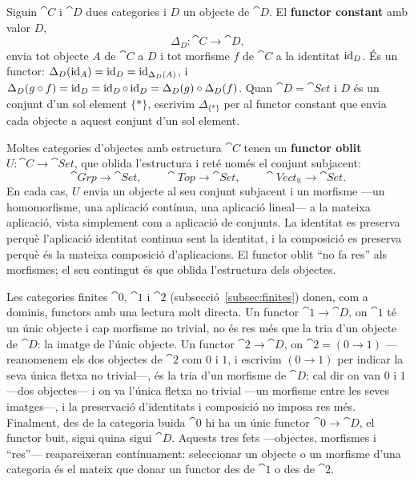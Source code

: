 \begin{exemple}\label{ex:functor-constant}
Siguin $\cat{C}$ i $\cat{D}$ dues categories i $D$ un objecte de $\cat{D}$. El \textbf{functor constant} amb valor $D$,
\[
\Delta_D\colon\cat{C}\to\cat{D},
\]
envia tot objecte $A$ de $\cat{C}$ a $D$ i tot morfisme $f$ de $\cat{C}$ a la identitat $\operatorname{id}_D$. És un functor: $\Delta_D(\operatorname{id}_A)=\operatorname{id}_D=\operatorname{id}_{\Delta_D(A)}$, i $\Delta_D(g\circ f)=\operatorname{id}_D=\operatorname{id}_D\circ\operatorname{id}_D=\Delta_D(g)\circ\Delta_D(f)$. Quan $\cat{D}=\cat{Set}$ i $D$ és un conjunt d'un sol element $\{\ast\}$, escrivim $\Delta_{\{\ast\}}$ per al functor constant que envia cada objecte a aquest conjunt d'un sol element.
\end{exemple}

\begin{exemple}
Moltes categories d'objectes amb estructura $\cat{C}$ tenen un \textbf{functor oblit} $U\colon\cat{C}\to\cat{Set}$, que oblida l'estructura i reté només el conjunt subjacent:
\[
\cat{Grp}\to\cat{Set},
\qquad
\cat{Top}\to\cat{Set},
\qquad
\cat{Vect}_{\mathbb K}\to\cat{Set}.
\]
En cada cas, $U$ envia un objecte al seu conjunt subjacent i un morfisme ---un homomorfisme, una aplicació contínua, una aplicació lineal--- a la mateixa aplicació, vista simplement com a aplicació de conjunts. La identitat es preserva perquè l'aplicació identitat continua sent la identitat, i la composició es preserva perquè és la mateixa composició d'aplicacions. El functor oblit \enquote{no fa res} als morfismes; el seu contingut és que oblida l'estructura dels objectes.
\end{exemple}

\begin{exemple}
Les categories finites $\cat{0}$, $\cat{1}$ i $\cat{2}$ (subsecció~\ref{subsec:finites}) donen, com a dominis, functors amb una lectura molt directa. Un functor $\cat{1}\to\cat{D}$, on $\cat{1}$ té un únic objecte i cap morfisme no trivial, no és res més que la tria d'un objecte de $\cat{D}$: la imatge de l'únic objecte. Un functor $\cat{2}\to\cat{D}$, on $\cat{2}=(0\to 1)$ ---reanomenem els dos objectes de $\cat{2}$ com $0$ i $1$, i escrivim $(0\to 1)$ per indicar la seva única fletxa no trivial---, és la tria d'un morfisme de $\cat{D}$: cal dir on van $0$ i $1$ ---dos objectes--- i on va l'única fletxa no trivial ---un morfisme entre les seves imatges---, i la preservació d'identitats i composició no imposa res més. Finalment, des de la categoria buida $\cat{0}$ hi ha un únic functor $\cat{0}\to\cat{D}$, el functor buit, sigui quina sigui $\cat{D}$. Aquests tres fets ---objectes, morfismes i \enquote{res}--- reapareixeran contínuament: seleccionar un objecte o un morfisme d'una categoria és el mateix que donar un functor des de $\cat{1}$ o des de $\cat{2}$.
\end{exemple}

